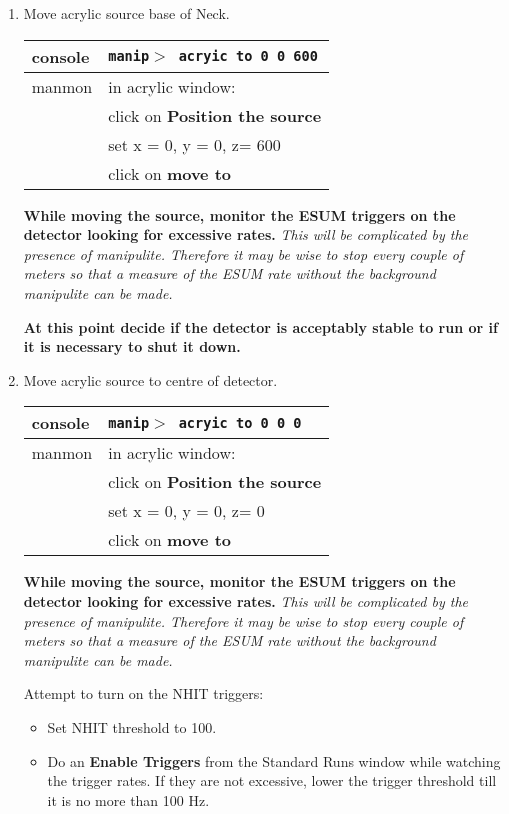 \begin{enumerate}
  
 \item\checkbox Move acrylic source base of Neck.
  \begin{center}
  \begin{tabular}{|l|l|}
  \hline
  console & {\tt manip$>$ acryic to 0 0 600} \\
  \hline
  manmon  & in acrylic window: \\
          & click on {\bf Position the source}\\
          & set x = 0, y = 0, z= 600\\
          & click on {\bf move to} \\
  \hline
  \end{tabular}
  \end{center}
  {\bf While moving the source, monitor the ESUM triggers on the detector
  looking for excessive rates.}  {\em This will be complicated by
  the presence of manipulite.  Therefore it may be wise to stop every
  couple of meters so that a measure of the ESUM rate without the
  background manipulite can be made.} 

  {\bf At this point decide if the detector is acceptably stable to
  run or if it is necessary to shut it down.}
  
 \item\checkbox Move acrylic source to centre of detector.
  \begin{center}
  \begin{tabular}{|l|l|}
  \hline
  console & {\tt manip$>$ acryic to 0 0 0} \\
  \hline
  manmon  & in acrylic window: \\
          & click on {\bf Position the source}\\
          & set x = 0, y = 0, z= 0\\
          & click on {\bf move to} \\
  \hline
  \end{tabular}
  \end{center}
  {\bf While moving the source, monitor the ESUM triggers on the detector
  looking for excessive rates.}  {\em This will be complicated by
  the presence of manipulite.  Therefore it may be wise to stop every
  couple of meters so that a measure of the ESUM rate without the
  background manipulite can be made.} 

\checkitem Attempt to turn on the NHIT triggers:
  \begin{itemize}
  \item Set NHIT threshold to 100.
  \item Do an {\bf Enable Triggers} from the Standard Runs window while
    watching the trigger rates.  If they are not excessive, 
    lower the trigger threshold till it is no more than 100 Hz.
  \end{itemize}



\end{enumerate}
